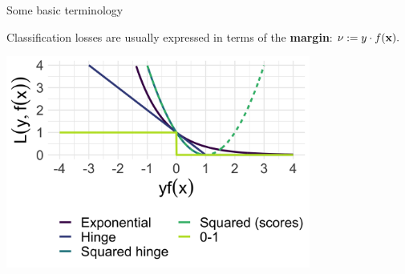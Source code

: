 \documentclass[11pt,compress,t,notes=noshow, xcolor=table]{beamer}
\begin{document}
\begin{vbframe}{Some basic terminology}


Classification losses are usually expressed in terms of the 
  \textbf{margin}: $\nu := y \cdot f(\mathbf{x}).$

\vfill

\begin{minipage}[b]{1\textwidth}
  \includegraphics[width=0.75\textwidth]{figure/plot_loss_overview_classif_2}
  \tiny \centering
\end{minipage}%


\end{vbframe}
\end{document}
